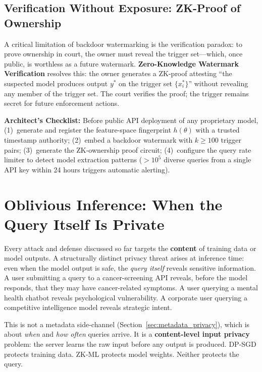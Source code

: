 \subsection{Verification Without Exposure: ZK-Proof of Ownership}
\label{subsec:zk_watermark}

A critical limitation of backdoor watermarking is the verification paradox: to prove ownership in court, the owner must reveal the trigger set---which, once public, is worthless as a future watermark. \textbf{Zero-Knowledge Watermark Verification} resolves this: the owner generates a ZK-proof attesting ``the suspected model produces output $y^*$ on the trigger set $\{x_i^*\}$'' without revealing any member of the trigger set. The court verifies the proof; the trigger remains secret for future enforcement actions.

\begin{svgraybox}
\textbf{Architect's Checklist:} Before public API deployment of any proprietary model, (1)~generate and register the feature-space fingerprint $h(\theta)$ with a trusted timestamp authority; (2)~embed a backdoor watermark with $k \geq 100$ trigger pairs; (3)~generate the ZK-ownership proof circuit; (4)~configure the query rate limiter to detect model extraction patterns ($>10^5$ diverse queries from a single API key within 24 hours triggers automatic alerting).
\end{svgraybox}

\section{Oblivious Inference: When the Query Itself Is Private}
\label{sec:oblivious_inference}

Every attack and defense discussed so far targets the \textbf{content} of training data or model outputs. A structurally distinct privacy threat arises at inference time: even when the model output is safe, the \emph{query itself} reveals sensitive information. A user submitting a query to a cancer-screening API reveals, before the model responds, that they may have cancer-related symptoms. A user querying a mental health chatbot reveals psychological vulnerability. A corporate user querying a competitive intelligence model reveals strategic intent.

This is not a metadata side-channel (Section~\ref{sec:metadata_privacy}), which is about \emph{when} and \emph{how often} queries arrive. It is a \textbf{content-level input privacy} problem: the server learns the raw input before any output is produced. DP-SGD protects training data. ZK-ML protects model weights. Neither protects the query.

